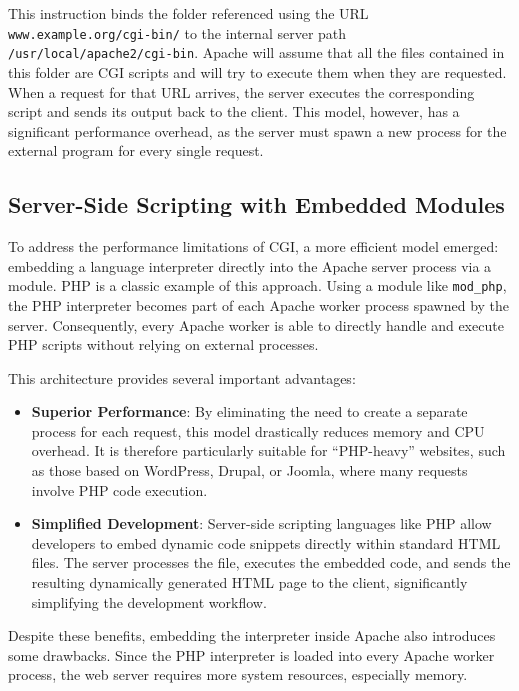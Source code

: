 \documentclass{scrbook}
\begin{document}
	This instruction binds the folder referenced using the URL \texttt{www.example.org/cgi-bin/} to the internal server path \texttt{/usr/local/apache2/cgi-bin}. Apache will assume that all the files contained in this folder are CGI scripts and will try to execute them when they are requested.\\	        
	        
	When a request for that URL arrives, the server executes the corresponding script and sends its output back to the client. This model, however, has a significant performance overhead, as the server must spawn a new process for the external program for every single request.
	    
	\subsection{Server-Side Scripting with Embedded Modules}
	To address the performance limitations of CGI, a more efficient model emerged: embedding a language interpreter directly into the Apache server process via a module. PHP is a classic example of this approach. Using a module like \texttt{mod\_php}, the PHP interpreter becomes part of each Apache worker process spawned by the server. Consequently, every Apache worker is able to directly handle and execute PHP scripts without relying on external processes.
	
	This architecture provides several important advantages:
	\begin{itemize}
		\item
		\textbf{Superior Performance}: By eliminating the need to create a separate process for each request, this model drastically reduces memory and CPU overhead. It is therefore particularly suitable for ``PHP-heavy'' websites, such as those based on WordPress, Drupal, or Joomla, where many requests involve PHP code execution.
		
		\item
		\textbf{Simplified Development}: Server-side scripting languages like PHP allow developers to embed dynamic code snippets directly within standard HTML files. The server processes the file, executes the embedded code, and sends the resulting dynamically generated HTML page to the client, significantly simplifying the development workflow.
	\end{itemize}
	
	Despite these benefits, embedding the interpreter inside Apache also introduces some drawbacks. Since the PHP interpreter is loaded into every Apache worker process, the web server requires more system resources, especially memory.
	
\end{document}
